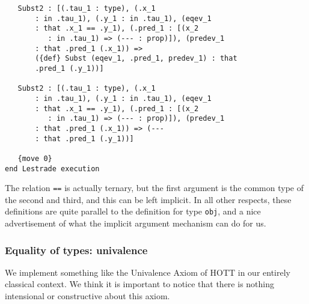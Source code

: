 \documentclass[12pt]{article}
\begin{document}
\begin{verbatim}
   Subst2 : [(.tau_1 : type), (.x_1 
       : in .tau_1), (.y_1 : in .tau_1), (eqev_1 
       : that .x_1 == .y_1), (.pred_1 : [(x_2 
          : in .tau_1) => (--- : prop)]), (predev_1 
       : that .pred_1 (.x_1)) => 
       ({def} Subst (eqev_1, .pred_1, predev_1) : that 
       .pred_1 (.y_1))]

   Subst2 : [(.tau_1 : type), (.x_1 
       : in .tau_1), (.y_1 : in .tau_1), (eqev_1 
       : that .x_1 == .y_1), (.pred_1 : [(x_2 
          : in .tau_1) => (--- : prop)]), (predev_1 
       : that .pred_1 (.x_1)) => (--- 
       : that .pred_1 (.y_1))]

   {move 0}
end Lestrade execution

\end{verbatim}

The relation {\tt ==} is actually ternary, but the first argument is the common type of the second and third, and this can be left implicit.  In all other respects, these
definitions are quite parallel to the definition for type {\tt obj}, and a nice advertisement of what the implicit argument mechanism can do for us.

\subsubsection{Equality of types:  univalence}

We implement something like the Univalence Axiom of HOTT in our entirely classical context.  We think it is important to notice that there is nothing intensional or constructive about this axiom.
\end{document}
